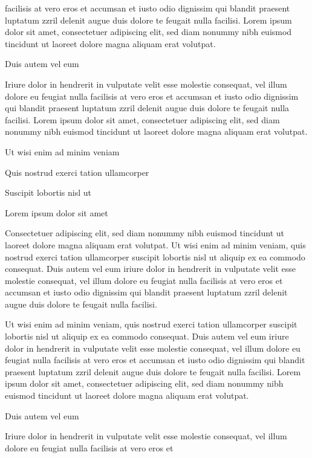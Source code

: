 \documentclass[11pt,twoside]{article}\makeatletter
\begin{document}
      facilisis at vero eros et accumsan et iusto odio dignissim qui blandit
      praesent luptatum zzril delenit augue duis dolore te feugait nulla
      facilisi. Lorem ipsum dolor sit amet, consectetuer adipiscing elit,
      sed diam nonummy nibh euismod tincidunt ut laoreet dolore magna
      aliquam erat volutpat. \par Duis autem vel eum \par Iriure dolor in hendrerit in vulputate velit esse molestie
      consequat, vel illum dolore eu feugiat nulla facilisis at vero eros et
      accumsan et iusto odio dignissim qui blandit praesent luptatum zzril
      delenit augue duis dolore te feugait nulla facilisi. Lorem ipsum dolor
      sit amet, consectetuer adipiscing elit, sed diam nonummy nibh euismod
      tincidunt ut laoreet dolore magna aliquam erat volutpat. \par Ut wisi enim ad minim veniam\par Quis nostrud exerci tation ullamcorper \par Suscipit lobortis nisl ut \par Lorem ipsum dolor sit amet\par Consectetuer adipiscing elit, sed diam nonummy nibh euismod
      tincidunt ut laoreet dolore magna aliquam erat volutpat. Ut wisi enim
      ad minim veniam, quis nostrud exerci tation ullamcorper suscipit
      lobortis nisl ut aliquip ex ea commodo consequat. Duis autem vel eum
      iriure dolor in hendrerit in vulputate velit esse molestie consequat,
      vel illum dolore eu feugiat nulla facilisis at vero eros et accumsan
      et iusto odio dignissim qui blandit praesent luptatum zzril delenit
      augue duis dolore te feugait nulla facilisi.\par Ut wisi enim ad minim veniam, quis nostrud exerci tation
      ullamcorper suscipit lobortis nisl ut aliquip ex ea commodo
      consequat. Duis autem vel eum iriure dolor in hendrerit in vulputate
      velit esse molestie consequat, vel illum dolore eu feugiat nulla
      facilisis at vero eros et accumsan et iusto odio dignissim qui blandit
      praesent luptatum zzril delenit augue duis dolore te feugait nulla
      facilisi. Lorem ipsum dolor sit amet, consectetuer adipiscing elit,
      sed diam nonummy nibh euismod tincidunt ut laoreet dolore magna
      aliquam erat volutpat. \par Duis autem vel eum \par Iriure dolor in hendrerit in vulputate velit esse molestie
      consequat, vel illum dolore eu feugiat nulla facilisis at vero eros et
\end{document}

